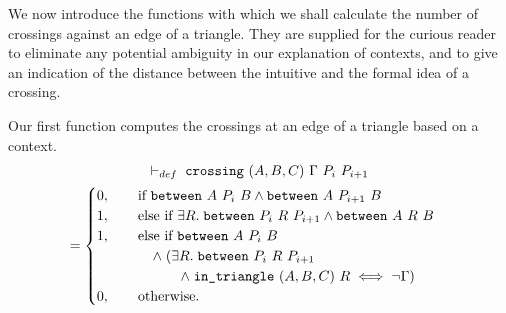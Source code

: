 

We now introduce the functions with which we shall calculate the number of crossings against an edge of a triangle. They are supplied for the curious reader to eliminate any potential ambiguity in our explanation of contexts, and to give an indication of the distance between the intuitive and the formal idea of a crossing. 

Our first function computes the crossings at an edge of a triangle based on a context. 
\begin{multline}\label{eq:oneCrossingDef}
  \vdash_{def}\;\texttt{crossing}\ (A,B,C)\ \Gamma\ P_i\ P_{i+1}\\
  = 
  \begin{cases}
    0, \qquad\text{if }\texttt{between}\ A\ P_i\ B\wedge\texttt{between}\ A\ P_{i+1}\ B\\
    1, \qquad\text{else if }\exists R.\; \texttt{between}\ P_i\ R\ P_{i+1}\wedge\texttt{between}\ A\ R\ B\\
    1, \qquad\text{else if }\texttt{between}\ A\ P_i\ B\\
    \qquad\qquad\wedge\; (\exists R.\; \texttt{between}\ P_i\ R\ P_{i+1}\\
    \qquad\qquad\qquad\wedge\;\texttt{in\_triangle}\ (A,B,C)\ R \iff \neg\Gamma)\\
    0, \qquad\text{otherwise.}
  \end{cases}
\end{multline}

